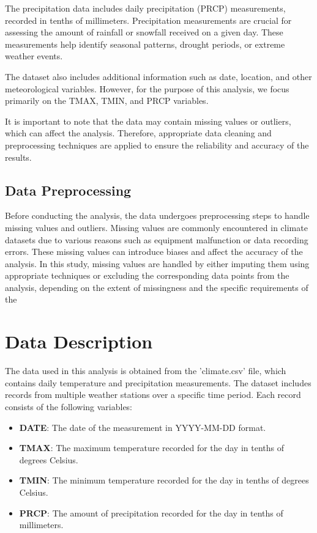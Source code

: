 \documentclass{article}
\begin{document}
The precipitation data includes daily precipitation (PRCP) measurements, recorded in tenths of millimeters. Precipitation measurements are crucial for assessing the amount of rainfall or snowfall received on a given day. These measurements help identify seasonal patterns, drought periods, or extreme weather events.

The dataset also includes additional information such as date, location, and other meteorological variables. However, for the purpose of this analysis, we focus primarily on the TMAX, TMIN, and PRCP variables.

It is important to note that the data may contain missing values or outliers, which can affect the analysis. Therefore, appropriate data cleaning and preprocessing techniques are applied to ensure the reliability and accuracy of the results.

\subsection{Data Preprocessing}

Before conducting the analysis, the data undergoes preprocessing steps to handle missing values and outliers. Missing values are commonly encountered in climate datasets due to various reasons such as equipment malfunction or data recording errors. These missing values can introduce biases and affect the accuracy of the analysis. In this study, missing values are handled by either imputing them using appropriate techniques or excluding the corresponding data points from the analysis, depending on the extent of missingness and the specific requirements of the
\section{Data Description}

The data used in this analysis is obtained from the 'climate.csv' file, which contains daily temperature and precipitation measurements. The dataset includes records from multiple weather stations over a specific time period. Each record consists of the following variables:

\begin{itemize}
  \item \textbf{DATE}: The date of the measurement in YYYY-MM-DD format.
  \item \textbf{TMAX}: The maximum temperature recorded for the day in tenths of degrees Celsius.
  \item \textbf{TMIN}: The minimum temperature recorded for the day in tenths of degrees Celsius.
  \item \textbf{PRCP}: The amount of precipitation recorded for the day in tenths of millimeters.
\end{itemize}
\end{document}
